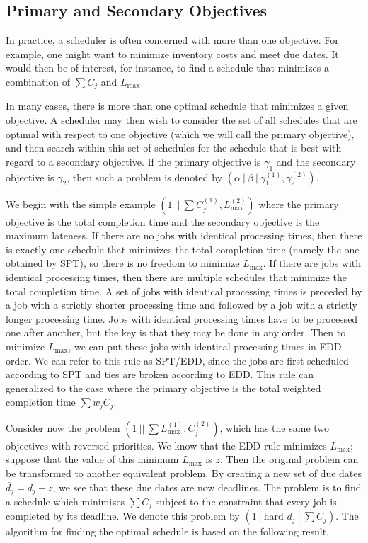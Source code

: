 \subsection{Primary and Secondary Objectives} \label{subsec:5.2}
In practice, a scheduler is often concerned with more than one objective. 
For example, one might want to minimize inventory costs and meet due dates. 
It would then be of interest, for instance, to find a schedule that minimizes a 
combination of $\sum C_j$ and $L_{\max}$. 

In many cases, there is more than one optimal schedule that minimizes a 
given objective. A scheduler may then wish to consider the set of all 
schedules that are optimal with respect to one objective (which 
we will call the primary objective), and then search within this set of 
schedules for the schedule that is best with regard to a secondary objective. 
If the primary objective is $\gamma_1$ and the secondary objective is 
$\gamma_2$, then such a problem is denoted by 
$(\alpha~|~\beta~|~\gamma_1^{(1)}, \gamma_2^{(2)})$.

We begin with the simple example $(1~||~\sum C_j^{(1)}, L_{\max}^{(2)})$ 
where the primary objective is the total completion time and the secondary 
objective is the maximum lateness. If there are no jobs with identical 
processing times, then there is exactly one schedule that minimizes the 
total completion time (namely the one obtained by SPT), so there is 
no freedom to minimize $L_{\max}$. If there are jobs with identical processing 
times, then there are multiple schedules that minimize the total completion 
time. A set of jobs with identical processing times is preceded by a job with a 
strictly shorter processing time and followed by a job with a strictly longer
processing time. Jobs with identical processing times have to be processed 
one after another, but the key is that they may be done in any order. 
Then to minimize $L_{\max}$, we can put these jobs with identical processing 
times in EDD order. We can refer to this rule as SPT/EDD, since the jobs are 
first scheduled according to SPT and ties are broken according to EDD. This 
rule can generalized to the case where the primary objective is 
the total weighted completion time $\sum w_j C_j$. 

Consider now the problem $(1~||~\sum L_{\max}^{(1)}, C_j^{(2)})$, which 
has the same two objectives with reversed priorities. We know that 
the EDD rule minimizes $L_{\max}$; suppose that the value of this minimum 
$L_{\max}$ is $z$. Then the original problem can be transformed to 
another equivalent problem. By creating a new set of due dates 
$\overline{d_j} = d_j + z$, we see that these due dates are now deadlines. 
The problem is to find a schedule which minimizes $\sum C_j$ subject to 
the constraint that every job is completed by its deadline. We denote 
this problem by $(1~|~\text{hard } d_j~|~\sum C_j)$. The algorithm 
for finding the optimal schedule is based on the following result. 

